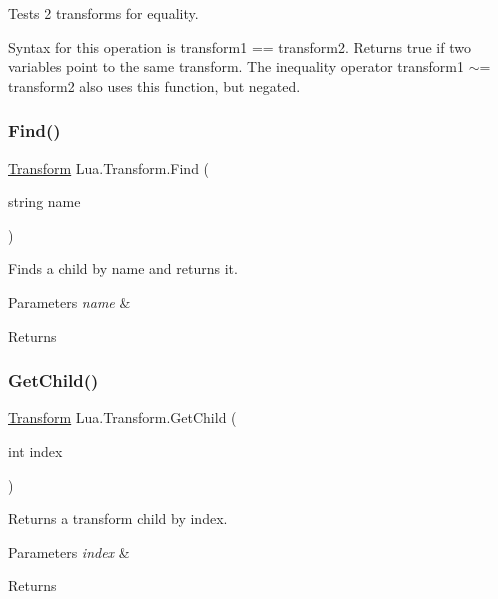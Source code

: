 Tests 2 transforms for equality. 

Syntax for this operation is {\ttfamily transform1 == transform2}. Returns true if two variables point to the same transform. The inequality operator {\ttfamily transform1 $\sim$= transform2} also uses this function, but negated. \mbox{\label{class_lua_1_1_transform_a79476caab32d323b7fee1955fda8d808}} 
\subsubsection{\texorpdfstring{Find()}{Find()}}
{\footnotesize\ttfamily \mbox{\hyperlink{class_lua_1_1_transform}{Transform}} Lua.\+Transform.\+Find (\begin{DoxyParamCaption}\item[{string}]{name }\end{DoxyParamCaption})}



Finds a child by name and returns it. 


\begin{DoxyParams}{Parameters}
{\em name} & \\
\hline
\end{DoxyParams}
\begin{DoxyReturn}{Returns}

\end{DoxyReturn}
\mbox{\label{class_lua_1_1_transform_a2535f3bade200a7f2c2c59debaeed41a}} 
\subsubsection{\texorpdfstring{GetChild()}{GetChild()}}
{\footnotesize\ttfamily \mbox{\hyperlink{class_lua_1_1_transform}{Transform}} Lua.\+Transform.\+Get\+Child (\begin{DoxyParamCaption}\item[{int}]{index }\end{DoxyParamCaption})}



Returns a transform child by index. 


\begin{DoxyParams}{Parameters}
{\em index} & \\
\hline
\end{DoxyParams}
\begin{DoxyReturn}{Returns}

\end{DoxyReturn}
\mbox{\label{class_lua_1_1_transform_a839d8eeda6ca8e0ea2a2e7b50643b0ca}} 
